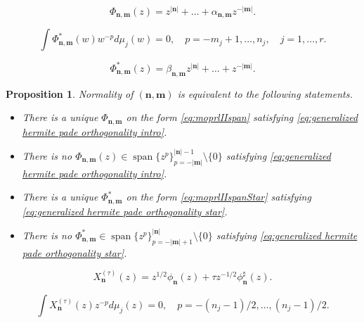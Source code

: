 \documentclass[10pt,a4paper]{amsart}
\newtheorem{prop}{Proposition}
\newcommand{\abs}[1]{\left|#1\right|}
\begin{document}
\begin{equation}\label{eq:moprlIIspan}
    \Phi_{\bm{n},\bm{m}}(z) = z^{\abs{\bm{n}}} + \ldots + \alpha_{\bm{n},\bm{m}}z^{-\abs{\bm{m}}}.
    \end{equation} 

    \begin{equation}
\label{eq:generalized hermite pade orthogonality star}
    \int \Phi_{\bm{n},\bm{m}}^*(w)w^{-p}d\mu_j(w) = 0, \quad p = -m_j+1,\dots,n_j, \quad j = 1,\dots,r.
\end{equation}

\begin{equation}\label{eq:moprlIIspanStar}
    \Phi_{\bm{n},\bm{m}}^*(z) = \beta_{\bm{n},\bm{m}}z^{\abs{\bm{n}}} + \ldots + z^{-\abs{\bm{m}}}.
\end{equation}

\begin{prop}\label{prop:normality criteria hp}
    Normality of $(\bm{n},\bm{m})$ is equivalent to the following statements.
    \begin{itemize}
        \item There is a unique $\Phi_{\bm{n},\bm{m}}$ on the form \eqref{eq:moprlIIspan} satisfying \eqref{eq:generalized hermite pade orthogonality intro}.
        \item There is no $\Phi_{\bm{n},\bm{m}}(z) \in \operatorname{span}\{z^p\}_{p = -\abs{\bm{m}}}^{\abs{\bm{n}}-1}\setminus\{0\}$ satisfying \eqref{eq:generalized hermite pade orthogonality intro}.
        \item There is a unique $\Phi_{\bm{n},\bm{m}}^*$ on the form \eqref{eq:moprlIIspanStar} satisfying \eqref{eq:generalized hermite pade orthogonality star}.
        \item There is no $\Phi_{\bm{n},\bm{m}}^* \in \operatorname{span}\{z^p\}_{p = -\abs{\bm{m}}+1}^{\abs{\bm{n}}}\setminus\{0\}$ satisfying \eqref{eq:generalized hermite pade orthogonality star}.
    \end{itemize}
\end{prop}

\begin{equation}\label{eq:paraorthogonal polynomials defn}
    X_{\bm{n}}^{(\tau)}(z) = z^{1/2}\phi_{\bm{n}}(z) + \tau z^{-1/2}\phi_{\bm{n}}^\sharp(z).
\end{equation}

\begin{equation}\label{eq:orthoPOPUC}
    \int X_{\bm{n}}^{(\tau)}(z)z^{-p}d\mu_j(z) = 0, \quad p = -(n_j-1)/2,\dots,(n_j-1)/2.
\end{equation}
\end{document}
